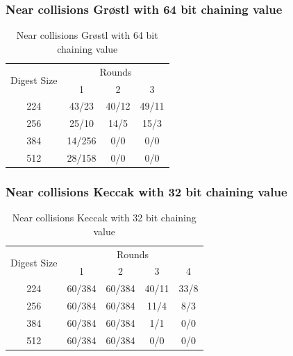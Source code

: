 \documentclass{beamer}
\begin{document}
\begin{frame}
\frametitle{Near collisions Gr{\o}stl with 64 bit chaining value}
\begin{table}
  \begin{tabular}{ | c | c | c | c | }                \hline
     \multirow{2}{*}{Digest Size} & \multicolumn{3}{|c|}{Rounds} \\ \cline{2-4}
                 & 1      & 2     & 3         \\ \hline
     224         & 43/23  & 40/12 & 49/11 \\ \hline
     256         & 25/10  & 14/5  & 15/3  \\ \hline
     384         & 14/256 & 0/0   & 0/0   \\ \hline
     512         & 28/158 & 0/0   & 0/0   \\ \hline
  \end{tabular}
  \caption{Near collisions Gr{\o}stl with 64 bit chaining value}
\end{table}
\end{frame}

\begin{frame}
\frametitle{Near collisions Keccak with 32 bit chaining value}
\begin{table}
  \begin{center}
    \begin{tabular}{ | c | c | c | c | c | } \hline
     \multirow{2}{*}{Digest Size} & \multicolumn{4}{|c|}{Rounds} \\ \cline{2-5}
                 & 1      & 2      & 3     & 4    \\ \hline
     224         & 60/384 & 60/384 & 40/11 & 33/8 \\ \hline
     256         & 60/384 & 60/384 & 11/4  & 8/3  \\ \hline
     384         & 60/384 & 60/384 & 1/1   & 0/0  \\ \hline
     512         & 60/384 & 60/384 & 0/0   & 0/0  \\ \hline
    \end{tabular}
    \caption{Near collisions Keccak with 32 bit chaining value}
  \end{center}
\end{table}
\end{frame}
\end{document}
